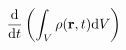\documentclass[preview]{standalone}
\begin{document}
\begin{align*}
\dv{}{t}\left( \int_{V} \rho(\mathbf{r},t) \dd V \right)
\end{align*}
\end{document}
